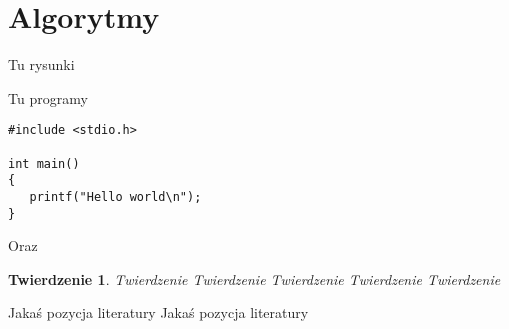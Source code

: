 \documentclass[twoside]{projektInzynierskiMS}
\newtheorem{tw}{Twierdzenie}%
\begin{document}
\section{Algorytmy}



          

Tu rysunki


Tu programy

\begin{verbatim}
#include <stdio.h>

int main()
{
   printf("Hello world\n");
}
\end{verbatim}

\noindent
Oraz 

\bigskip

\vrule\hspace{10pt}\begin{minipage}{10cm}
\end{minipage}

\begin{tw}
Twierdzenie Twierdzenie Twierdzenie Twierdzenie Twierdzenie 
\end{tw}
\begin{thebibliography}{12}

 Jakaś pozycja literatury
 Jakaś pozycja literatury

\end{thebibliography}
\end{document}
